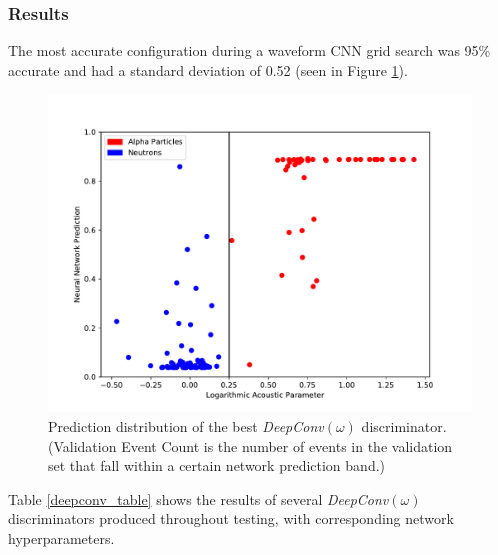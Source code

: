 \documentclass[10pt]{article}
\begin{document}
\subsubsection{Results}

The most accurate configuration during a waveform CNN grid search was 95\% accurate and had a standard deviation of 0.52 (seen in Figure \ref{waveform_hist}).

\begin{figure}[h]
    \centering
    \includegraphics[width=\textwidth]{waveform_hist}
    \caption{\label{waveform_hist} Prediction distribution of the best {\it DeepConv}$(\omega)$ discriminator. (Validation Event Count is the number of events in the validation set that fall within a certain network prediction band.)}
\end{figure}

Table \ref{deepconv_table} shows the results of several {\it DeepConv}$(\omega)$ discriminators produced throughout testing, with corresponding network hyperparameters.
\end{document}
